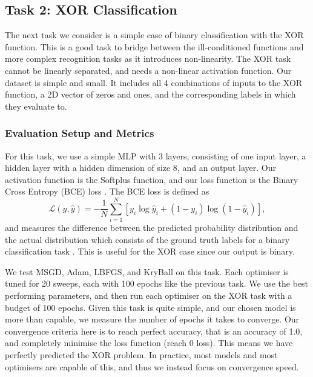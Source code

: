 \subsection{Task 2: XOR Classification}
\label{ssec:task_2_xor_classification}

The next task we consider is a simple case of binary classification with the XOR function. This is a good task to bridge between the ill-conditioned functions and more complex recognition tasks as it introduces non-linearity. The XOR task cannot be linearly separated, and needs a non-linear activation function. Our dataset is simple and small. It includes all 4 combinations of inputs to the XOR function, a 2D vector of zeros and ones, and the corresponding labels in which they evaluate to.

\subsubsection{Evaluation Setup and Metrics}
\label{sssec:task_2_evaluation_setup_and_metrics}
For this task, we use a simple MLP with 3 layers, consisting of one input layer, a hidden layer with a hidden dimension of size 8, and an output layer. Our activation function is the Softplus function, and our loss function is the Binary Cross Entropy (BCE) loss \citep{mao2023cross}. The BCE loss is defined as
\begin{equation}
\mathcal{L}(y, \hat{y}) = -\frac{1}{N} \sum_{i=1}^N \left[ y_i \log \hat{y}_i + (1 - y_i) \log (1 - \hat{y}_i) \right],
\end{equation}
and measures the difference between the predicted probability distribution and the actual distribution which consists of the ground truth labels for a binary classification task \citep{mao2023cross}. This is useful for the XOR case since our output is binary.

We test MSGD, Adam, LBFGS, and KryBall on this task. Each optimiser is tuned for 20 sweeps, each with 100 epochs like the previous task. We use the best performing parameters, and then run each optimiser on the XOR task with a budget of 100 epochs. Given this task is quite simple, and our chosen model is more than capable, we measure the number of epochs it takes to converge. Our convergence criteria here is to reach perfect accuracy, that is an accuracy of 1.0, and completely minimise the loss function (reach 0 loss). This means we have perfectly predicted the XOR problem. In practice, most models and most optimisers are capable of this, and thus we instead focus on convergence speed. 

